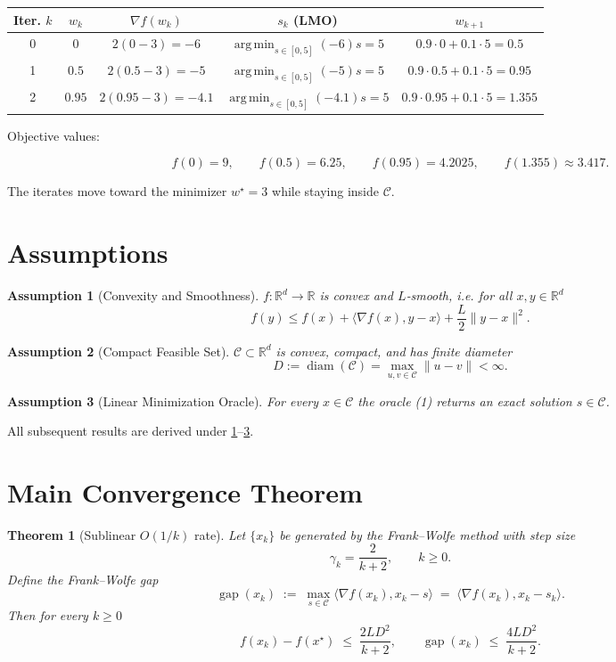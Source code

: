 \documentclass{article}
\newtheorem{theorem}{Theorem}
\newtheorem{assumption}{Assumption}
\newcommand{\diam}{\operatorname{diam}}
\newcommand{\gap}{\operatorname{gap}}
\newcommand{\argmin}{\operatorname*{arg\,min}}
\newcommand{\ip}[2]{\langle #1,#2\rangle}
\newcommand{\R}{\mathbb{R}}
\begin{document}
\begin{center}
\begin{tabular}{c|c|c|c|c}
\textbf{Iter.} $k$ & $w_{k}$ & $\nabla f(w_{k})$ & $s_{k}$ (LMO) & $w_{k+1}$ \\ \hline
0 & $0$ & $2(0-3)=-6$ & $\argmin_{s\in[0,5]}(-6)s = 5$ & $0.9\cdot0+0.1\cdot5=0.5$\\
1 & $0.5$ & $2(0.5-3)=-5$ & $\argmin_{s\in[0,5]}(-5)s = 5$ & $0.9\cdot0.5+0.1\cdot5=0.95$\\
2 & $0.95$ & $2(0.95-3)=-4.1$ & $\argmin_{s\in[0,5]}(-4.1)s = 5$ & $0.9\cdot0.95+0.1\cdot5=1.355$\\
\end{tabular}
\end{center}

Objective values:

\[
f(0)=9,\qquad f(0.5)=6.25,\qquad f(0.95)=4.2025,\qquad f(1.355)\approx3.417.
\]

The iterates move toward the minimizer $w^{\star}=3$ while staying inside $\mathcal{C}$.

\newpage
\section*{Assumptions}
\begin{assumption}[Convexity and Smoothness]\label{ass:convex}
$f:\R^{d}\to\R$ is convex and $L$‑smooth, i.e. for all $x,y\in\R^{d}$
\[
f(y)\le f(x)+\ip{\nabla f(x)}{y-x}+\frac{L}{2}\|y-x\|^{2}. \tag{3}
\]
\end{assumption}
\begin{assumption}[Compact Feasible Set]\label{ass:compact}
$\mathcal{C}\subset\R^{d}$ is convex, compact, and has finite diameter
\[
D:=\diam(\mathcal{C})=\max_{u,v\in\mathcal{C}}\|u-v\|<\infty. \tag{4}
\]
\end{assumption}
\begin{assumption}[Linear Minimization Oracle]\label{ass:lmo}
For every $x\in\mathcal{C}$ the oracle (1) returns an exact solution
$s\in\mathcal{C}$.
\end{assumption}
All subsequent results are derived under \ref{ass:convex}–\ref{ass:lmo}.

\section*{Main Convergence Theorem}
\begin{theorem}[Sublinear $O(1/k)$ rate]\label{thm:fw}
Let $\{x_{k}\}$ be generated by the Frank–Wolfe method with step size
\[
\gamma_{k}=\frac{2}{k+2},\qquad k\ge0. \tag{5}
\]
Define the \emph{Frank–Wolfe gap}
\[
\gap(x_{k})\;:=\;\max_{s\in\mathcal{C}}\ip{\nabla f(x_{k})}{x_{k}-s}
            \;=\;\ip{\nabla f(x_{k})}{x_{k}-s_{k}}. \tag{6}
\]
Then for every $k\ge0$
\[
f(x_{k})-f(x^{\star})\;\le\;\frac{2L D^{2}}{k+2}, \qquad
\gap(x_{k})\;\le\;\frac{4L D^{2}}{k+2}. \tag{7}
\]
\end{theorem}
\end{document}
